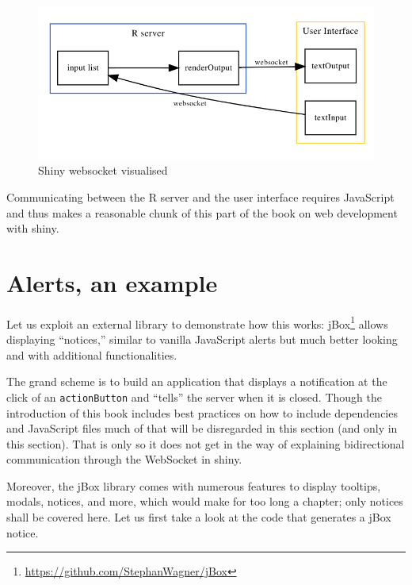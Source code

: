\documentclass[10pt,]{krantz}
\renewcommand{\href}[2]{#2\footnote{\url{#1}}}
\begin{document}
\begin{figure}[H]

{\centering \includegraphics[width=1\linewidth]{images/04-shiny-websocket} 

}

\caption{Shiny websocket visualised}\label{fig:shiny-websocket-diagram}
\end{figure}

Communicating between the R server and the user interface requires JavaScript and thus makes a reasonable chunk of this part of the book on web development with shiny.

\hypertarget{shiny-intro-example}{%
\section{Alerts, an example}\label{shiny-intro-example}}

Let us exploit an external library to demonstrate how this works: \href{https://github.com/StephanWagner/jBox}{jBox} allows displaying ``notices,'' similar to vanilla JavaScript alerts but much better looking and with additional functionalities.

The grand scheme is to build an application that displays a notification at the click of an \texttt{actionButton} and ``tells'' the server when it is closed. Though the introduction of this book includes best practices on how to include dependencies and JavaScript files much of that will be disregarded in this section (and only in this section). That is only so it does not get in the way of explaining bidirectional communication through the WebSocket in shiny.

Moreover, the jBox library comes with numerous features to display tooltips, modals, notices, and more, which would make for too long a chapter; only notices shall be covered here. Let us first take a look at the code that generates a jBox notice.
\end{document}
